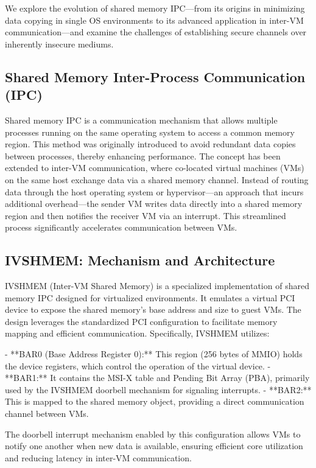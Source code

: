 \documentclass[conference]{IEEEtran}
\begin{document}
We explore the evolution of shared memory IPC—from its origins in minimizing
data copying in single OS environments to its advanced application in inter-VM
communication—and examine the challenges of establishing secure channels over
inherently insecure mediums.

\subsection{Shared Memory Inter-Process Communication (IPC)}

Shared memory IPC is a communication mechanism that allows multiple processes
running on the same operating system to access a common memory region. This
method was originally introduced to avoid redundant data copies between
processes, thereby enhancing performance. The concept has been extended to
inter-VM communication, where co-located virtual machines (VMs) on the same
host exchange data via a shared memory channel. Instead of routing data through
the host operating system or hypervisor—an approach that incurs additional
overhead—the sender VM writes data directly into a shared memory region and
then notifies the receiver VM via an interrupt. This streamlined process
significantly accelerates communication between VMs.

\subsection{IVSHMEM: Mechanism and Architecture}

IVSHMEM (Inter-VM Shared Memory) is a specialized implementation of shared
memory IPC designed for virtualized environments. It emulates a virtual PCI
device to expose the shared memory's base address and size to guest VMs. The
design leverages the standardized PCI configuration to facilitate memory
mapping and efficient communication. Specifically, IVSHMEM utilizes:

- **BAR0 (Base Address Register 0):** This region (256 bytes of MMIO) holds the device registers, which control the operation of the virtual device.
- **BAR1:** It contains the MSI-X table and Pending Bit Array (PBA), primarily used by the IVSHMEM doorbell mechanism for signaling interrupts.
- **BAR2:** This is mapped to the shared memory object, providing a direct communication channel between VMs.

The doorbell interrupt mechanism enabled by this configuration allows VMs to
notify one another when new data is available, ensuring efficient core
utilization and reducing latency in inter-VM communication.
\end{document}
